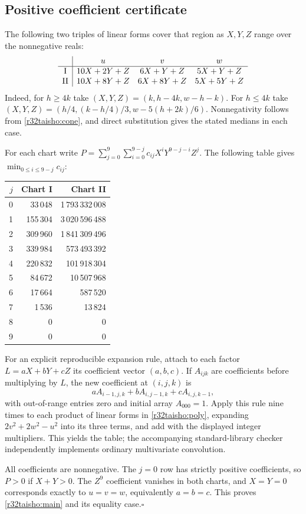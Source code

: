 \documentclass[11pt,a4paper]{article}
\numberwithin{equation}{section}
\theoremstyle{definition}
\theoremstyle{remark}
\begin{document}
\subsection*{Positive coefficient certificate}
The following two triples of linear forms cover that region as $X,Y,Z$ range over the nonnegative reals:
\[
\begin{array}{c|ccc}
 &u&v&w\\ \hline
 {\rm I}&10X+2Y+Z&6X+Y+Z&5X+Y+Z\\
 {\rm II}&10X+8Y+Z&6X+8Y+Z&5X+5Y+Z
\end{array}
\]
Indeed, for $h\ge4k$ take $(X,Y,Z)=(k,h-4k,w-h-k)$. For $h\le4k$ take $(X,Y,Z)=(h/4,(k-h/4)/3,w-5(h+2k)/6)$. Nonnegativity follows from \eqref{r32taisho:cone}, and direct substitution gives the stated medians in each case.

For each chart write $P=\sum_{j=0}^9\sum_{i=0}^{9-j} c_{ij}X^iY^{9-j-i}Z^j$. The following table gives $\min_{0\le i\le9-j} c_{ij}$:
\begin{center}
\begin{tabular}{r|r|r}
$j$ & Chart I & Chart II\\ \hline
0&33\,048&1\,793\,332\,008\\
1&155\,304&3\,020\,596\,488\\
2&309\,960&1\,841\,309\,496\\
3&339\,984&573\,493\,392\\
4&220\,832&101\,918\,304\\
5&84\,672&10\,507\,968\\
6&17\,664&587\,520\\
7&1\,536&13\,824\\
8&0&0\\
9&0&0
\end{tabular}
\end{center}
For an explicit reproducible expansion rule, attach to each factor $L=aX+bY+cZ$ its coefficient vector $(a,b,c)$. If $A_{ijk}$ are coefficients before multiplying by $L$, the new coefficient at $(i,j,k)$ is
\[
 aA_{i-1,j,k}+bA_{i,j-1,k}+cA_{i,j,k-1},
\]
with out-of-range entries zero and initial array $A_{000}=1$. Apply this rule nine times to each product of linear forms in \eqref{r32taisho:poly}, expanding $2v^2+2w^2-u^2$ into its three terms, and add with the displayed integer multipliers. This yields the table; the accompanying standard-library checker independently implements ordinary multivariate convolution.

All coefficients are nonnegative. The $j=0$ row has strictly positive coefficients, so $P>0$ if $X+Y>0$. The $Z^9$ coefficient vanishes in both charts, and $X=Y=0$ corresponds exactly to $u=v=w$, equivalently $a=b=c$. This proves \eqref{r32taisho:main} and its equality case.\hfill$\square$
\end{document}

